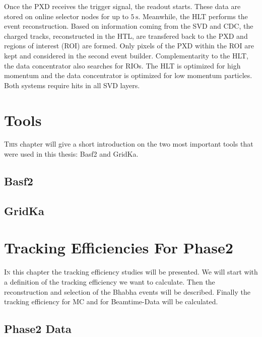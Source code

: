 \documentclass[a4paper,11pt,twosided,final,german,openbib,pdftex,listof=totoc,bibliography=totoc]{scrbook}
\begin{document}
Once the PXD receives the trigger signal, the readout starts. These data are stored on online selector nodes for up to $5\,\textrm{s}$. Meanwhile, the HLT performs the event reconstruction. Based on information coming from the SVD and CDC, the charged tracks, reconstructed in the HTL, are transfered back to the PXD and regions of interest (ROI) are formed. Only pixels of the PXD within the ROI are kept and considered in the second event builder. Complementarity to the HLT, the data concentrator also searches for RIOs. The HLT is optimized for high momentum and the data concentrator is optimized for low momentum particles. Both systems require hits in all SVD layers. 





\chapter{Tools}
\label{sec:Tools}

\lettrine{T}{his} chapter will give a short introduction on the two most important tools that were used in this thesis: Basf2 and GridKa.


\section{Basf2}




\section{GridKa}






\chapter{Tracking Efficiencies For Phase2}
\label{chap:Phase2Eff}

\lettrine{I}{n} this chapter the tracking efficiency studies will be presented. We will start with a definition of the tracking efficiency we want to calculate. Then the reconstruction and selection of the Bhabha events will be described. Finally the tracking efficiency for MC and for Beamtime-Data will be calculated.

\section{Phase2 Data}
\label{sec:Phase2}
\end{document}
